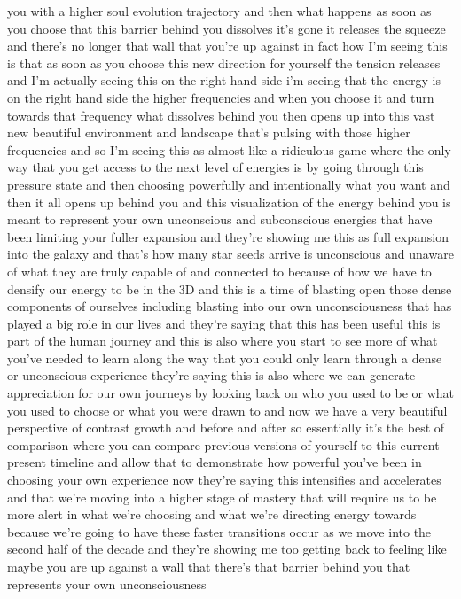 \documentclass{article}
\begin{document}
you with a higher soul evolution trajectory and then what happens as
soon as you choose that this barrier behind you dissolves it's gone it
releases the squeeze and there's no longer that wall that you're up
against in fact how I'm seeing this is that as soon as you choose this
new direction for yourself the tension releases and I'm actually seeing
this on the right hand side i'm seeing that the energy is on the right
hand side the higher frequencies and when you choose it and turn towards
that frequency what dissolves behind you then opens up into this vast
new beautiful environment and landscape that's pulsing with those higher
frequencies and so I'm seeing this as almost like a ridiculous game
where the only way that you get access to the next level of energies is
by going through this pressure state and then choosing powerfully and
intentionally what you want and then it all opens up behind you and this
visualization of the energy behind you is meant to represent your own
unconscious and subconscious energies that have been limiting your
fuller expansion and they're showing me this as full expansion into the
galaxy and that's how many star seeds arrive is unconscious and unaware
of what they are truly capable of and connected to because of how we
have to densify our energy to be in the 3D and this is a time of
blasting open those dense components of ourselves including blasting
into our own unconsciousness that has played a big role in our lives and
they're saying that this has been useful this is part of the human
journey and this is also where you start to see more of what you've
needed to learn along the way that you could only learn through a dense
or unconscious experience they're saying this is also where we can
generate appreciation for our own journeys by looking back on who you
used to be or what you used to choose or what you were drawn to and now
we have a very beautiful perspective of contrast growth and before and
after so essentially it's the best of comparison where you can compare
previous versions of yourself to this current present timeline and allow
that to demonstrate how powerful you've been in choosing your own
experience now they're saying this intensifies and accelerates and that
we're moving into a higher stage of mastery that will require us to be
more alert in what we're choosing and what we're directing energy
towards because we're going to have these faster transitions occur as we
move into the second half of the decade and they're showing me too
getting back to feeling like maybe you are up against a wall that
there's that barrier behind you that represents your own unconsciousness
\end{document}
